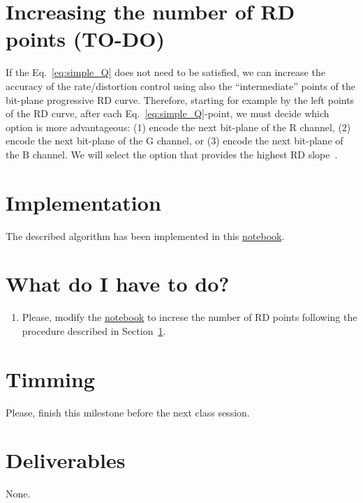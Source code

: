 \section{Increasing the number of RD points (TO-DO)}
\label{sec:increasing}
If the Eq.~\eqref{eq:simple_Q} does not need to be satisfied, we can
increase the accuracy of the rate/distortion control using also the
``intermediate'' points of the bit-plane progressive RD
curve. Therefore, starting for example by the left points of the RD
curve, after each Eq.~\eqref{eq:simple_Q}-point, we must decide which
option is more advantageous: (1) encode the next bit-plane of the
$\text{R}$ channel, (2) encode the next bit-plane of the $\text{G}$
channel, or (3) encode the next bit-plane of the $\text{B}$
channel. We will select the option that provides the highest RD
slope~\cite{vruiz__information_theory}.

\section{Implementation}
The described algorithm has been implemented in this
\href{https://github.com/Sistemas-Multimedia/Sistemas-Multimedia.github.io/blob/master/contents/RGB_SQ/RGB_SQ.ipynb}{notebook}.


\section{What do I have to do?}

\begin{enumerate}
\item Please, modify the
  \href{https://github.com/Sistemas-Multimedia/Sistemas-Multimedia.github.io/blob/master/contents/RGB_SQ/RGB_SQ.ipynb}{notebook}
  to increse the number of RD points following the procedure described
  in Section~\ref{sec:increasing}.
\end{enumerate}

\section{Timming}

Please, finish this milestone before the next class session.

\section{Deliverables}

None.

